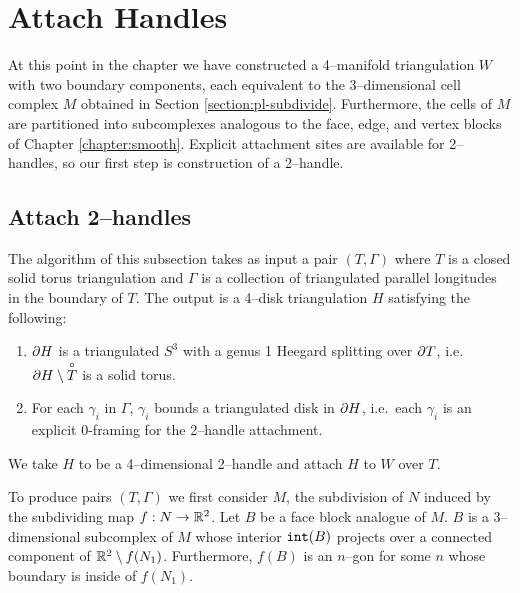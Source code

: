\section{Attach Handles}
\label{section:pl-handle}

At this point in the chapter we have constructed a 4--manifold triangulation $W$ with two boundary components, each equivalent to the 3--dimensional cell complex $M$ obtained in Section \ref{section:pl-subdivide}.
Furthermore, the cells of $M$ are partitioned into subcomplexes analogous to the face, edge, and vertex blocks of Chapter \ref{chapter:smooth}.
Explicit attachment sites are available for 2--handles, so our first step is construction of a 2--handle.

\subsection{Attach 2--handles}
\label{section:pl-2-handle}

The algorithm of this subsection takes as input a pair $(T,\Gamma)$ where $T$ is a closed solid torus triangulation and $\Gamma$ is a collection of triangulated parallel longitudes in the boundary of $T$.
The output is a 4--disk triangulation $H$ satisfying the following:
\begin{enumerate}
	\item $\partial H$ is a triangulated $S^3$ with a genus 1 Heegard splitting over $\partial T$, i.e.\ $\partial H\setminus \overset{\circ}{T}$ is a solid torus.
	\item For each $\gamma_i$ in $\Gamma$, $\gamma_i$ bounds a triangulated disk in $\partial H$, i.e.\ each $\gamma_i$ is an explicit 0-framing for the 2--handle attachment.
\end{enumerate}
We take $H$ to be a 4--dimensional 2--handle and attach $H$ to $W$ over $T$.

To produce pairs $(T,\Gamma)$ we first consider $M$, the subdivision of $N$ induced by the subdividing map $f:N\to\mathbb{R}^2$.
Let $B$ be a face block analogue of $M$.
$B$ is a 3--dimensional subcomplex of $M$ whose interior $\texttt{int}(B)$ projects over a connected component of $\mathbb{R}^2\setminus f(N_1)$.
Furthermore, $f(B)$ is an $n$--gon for some $n$ whose boundary is inside of $f(N_1)$.



